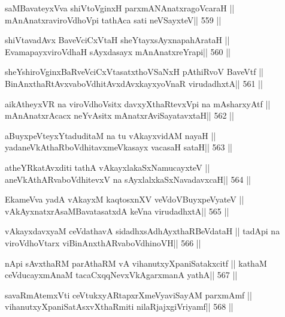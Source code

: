 \begin{shl}
saMBavateyxVva shiVtoV\s ginxH parxmANAnatxragoVcaraH ||
mAnAnatxraviroVdhoV\s pi tathAca sati neVSayxteV\hfill || 559 ||
\end{shl}

\begin{shl}
shiVtavadAvx BaveVciCxVtaH sheYtayxsAyxnapahArataH ||
EvamapayxviroVdhaH sAyxdasayx mAnAnatxreYrapi\hfill || 560 ||
\end{shl}

\begin{shl}
sheYshiroV\s ginxBaRveVciCxVtasatxthoVSaNxH pAthiRvoV BaveVtf ||
BinAnxthaRtAvxvaboVdhitAvxdAvxkayxyoVnaR virudadhxtA\hfill || 561 ||
\end{shl}

\begin{shl}
aikAtheyxVR na viroVdhoV\s sitx davxyXthaRtevxV\s pi na mAsharxyAtf ||
mAnAnatxrAcacx neYvAsitx mAnatxrAviSayatavxtaH\hfill || 562 ||
\end{shl}

\begin{shl}
aBuyxpeVteyxYtaduditaM na tu vAkayxvidAM nayaH ||
yadaneVkAthaRboVdhitavxmeVkasayx vacasaH sataH\hfill || 563 ||
\end{shl}

\begin{shl}
atheYRkatAvxditi tathA vAkayxlakaSxNamucayxteV ||
aneVkAthARvaboVdhitevxV na sAyxlalxkaSxNavadavxcaH\hfill || 564 ||
\end{shl}

\begin{shl}
EkameVva yadA vAkayxM kaqtosxnXV veVdoV\s BuyxpeVyateV ||
vAkAyxnatxrAsaMBavatasatxdA keVna virudadhxtA\hfill || 565 ||
\end{shl}

\begin{shl}
vAkayxdavxyaM ceVdathavA sidadhxsAdhAyxthaRBeVdataH ||
tadA\s pi na viroVdhoV\s tarx viBinAnxthARvaboVdhinoVH\hfill || 566 ||
\end{shl}

\begin{shl}
nApi sAvxthaRM parAthaRM vA vihanutxyXpaniSatakxcitf ||
kathaM ceVducayxmAnaM tacaCxqqNevxVkAgarxmanA yathA\hfill || 567 ||
\end{shl}

\begin{shl}
savaRmAtemxVti ceVtukxyARtapxrXmeVyaviSayAM parxmAmf ||
vihanutxyXpaniSatAsxvXthaRmiti nilaRjajxgiVriyamf\hfill || 568 ||
\end{shl}

